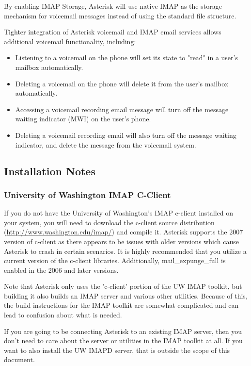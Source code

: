 By enabling IMAP Storage,  Asterisk will use native IMAP as the storage
mechanism for voicemail messages instead of using the standard file structure.

Tighter integration of Asterisk voicemail and IMAP email services allows
additional voicemail functionality, including:

\begin{itemize}
 \item Listening to a voicemail on the phone will set its state to "read" in
   a user's mailbox automatically.
 \item Deleting a voicemail on the phone will delete it from the user's
   mailbox automatically.
 \item Accessing a voicemail recording email message will turn off the message
   waiting indicator (MWI) on the user's phone.
 \item Deleting a voicemail recording email will also turn off the message
   waiting indicator, and delete the message from the voicemail system.
\end{itemize}

\subsection{Installation Notes}

\subsubsection{University of Washington IMAP C-Client}

If you do not have the University of Washington's IMAP c-client
installed on your system, you will need to download the c-client
source distribution (\url{http://www.washington.edu/imap/}) and compile it.
Asterisk supports the 2007 version of c-client as there appears to be issues
with older versions which cause Asterisk to crash in certain scenarios. It
is highly recommended that you utilize a current version of the c-client
libraries. Additionally, mail\_expunge\_full is enabled in the 2006 and later
versions.

Note that Asterisk only uses the 'c-client' portion of the UW IMAP toolkit,
but building it also builds an IMAP server and various other utilities.
Because of this, the build instructions for the IMAP toolkit are somewhat
complicated and can lead to confusion about what is needed.

If you are going to be connecting Asterisk to an existing IMAP server,
then you don't need to care about the server or utilities in the IMAP
toolkit at all. If you want to also install the UW IMAPD server, that
is outside the scope of this document.

